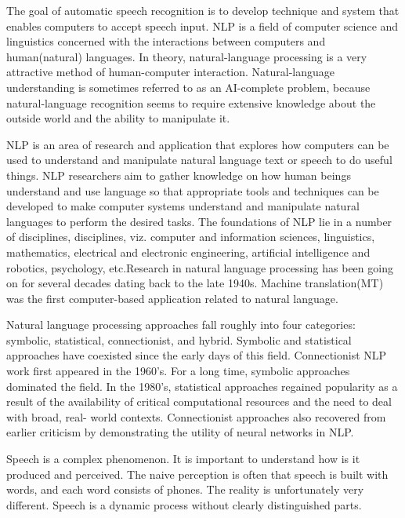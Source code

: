 \documentclass[12pt,a4paper,oldfontcommands]{memoir}
\begin{document}
The goal of automatic speech recognition is to develop technique and system that enables computers to accept speech input. NLP is a field of computer science and linguistics concerned with the interactions between computers and human(natural) languages. In theory, natural-language processing is a very attractive method of human-computer interaction. Natural-language understanding is sometimes referred to as an AI-complete problem, because natural-language recognition seems to require extensive knowledge about the outside world and the ability to manipulate it.

NLP is an area of research and application that explores how computers can be used to understand and manipulate natural language text or speech to do useful things. NLP researchers aim to gather knowledge on how human beings understand and use language so that appropriate tools and techniques can be developed to make computer systems understand and manipulate natural languages to perform the desired tasks. The foundations of NLP lie in a number of disciplines, disciplines, viz. computer and information sciences, linguistics, mathematics, electrical and electronic engineering, artificial intelligence and robotics, psychology, etc.Research in natural language processing has been going on for several decades dating back to the late 1940s. Machine translation(MT) was the first computer-based application related to natural language.

Natural language processing approaches fall roughly into four categories: symbolic, statistical, connectionist, and hybrid. Symbolic and statistical approaches have coexisted since the early days of this field. Connectionist NLP work first appeared in the 1960’s. For a long time, symbolic approaches dominated the field. In the 1980’s, statistical approaches regained popularity as a result of the availability of critical computational resources and the need to deal with broad, real- world contexts. Connectionist approaches also recovered from earlier criticism by demonstrating the utility of neural networks in NLP.

Speech is a complex phenomenon. It is important to  understand how is it produced and perceived. The naive perception is often that speech is built with words, and each word consists of phones. The reality is unfortunately very different. Speech is a dynamic process without clearly distinguished parts.
\end{document}
